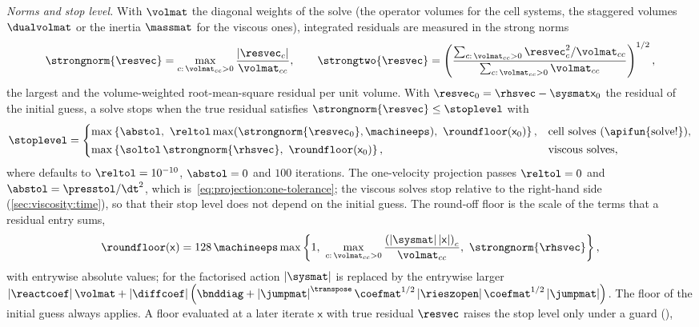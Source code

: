 \emph{Norms and stop level.} With $\volmat$ the diagonal weights of the solve
(the operator volumes for the cell systems, the staggered volumes
$\dualvolmat$ or the inertia $\massmat$ for the viscous ones), integrated
residuals are measured in the strong norms
\begin{equation}\label{eq:solvers:norms}
  \strongnorm{\resvec}=\max_{c:\,\volmat_{cc}>0}\frac{\abs{\resvec_c}}{\volmat_{cc}},\qquad
  \strongtwo{\resvec}=\roundpar{\frac{\sum_{c:\,\volmat_{cc}>0}\resvec_c^2/\volmat_{cc}}{\sum_{c:\,\volmat_{cc}>0}\volmat_{cc}}}^{1/2},
\end{equation}
the largest and the volume-weighted root-mean-square residual per unit volume.
With $\resvec_0=\rhsvec-\sysmat\mathsf{x}_0$ the residual of the initial
guess, a solve stops when the true residual satisfies
$\strongnorm{\resvec}\le\stoplevel$ with
\begin{equation}\label{eq:solvers:target}
  \stoplevel=\begin{cases}
    \max\curlypar{\abstol,\ \reltol\max(\strongnorm{\resvec_0},\machineeps),\ \roundfloor(\mathsf{x}_0)}, & \text{cell solves (\apifun{solve!})},\\[2pt]
    \max\curlypar{\soltol\,\strongnorm{\rhsvec},\ \roundfloor(\mathsf{x}_0)}, & \text{viscous solves},
  \end{cases}
\end{equation}
where  defaults to $\reltol=10^{-10}$, $\abstol=0$ and $100$
iterations. The one-velocity projection passes $\reltol=0$ and
$\abstol=\presstol/\dt^2$, which is~\cref{eq:projection:one-tolerance}; the
viscous solves stop relative to the right-hand side
(\cref{sec:viscosity:time}), so that their stop level does not depend on the
initial guess. The round-off floor is the scale of the terms that a residual
entry sums,
\begin{equation}\label{eq:solvers:floor}
  \roundfloor(\mathsf{x})=128\,\machineeps\max\curlypar{1,\ \max_{c:\,\volmat_{cc}>0}\frac{\roundpar{\abs{\sysmat}\abs{\mathsf{x}}}_c}{\volmat_{cc}},\ \strongnorm{\rhsvec}},
\end{equation}
with entrywise absolute values; for the factorised action $\abs{\sysmat}$ is
replaced by the entrywise larger
$\abs{\reactcoef}\volmat+\abs{\diffcoef}\roundpar{\bnddiag+\abs{\jumpmat}^{\transpose}\coefmat^{1/2}\abs{\rieszopen}\coefmat^{1/2}\abs{\jumpmat}}$.
The floor of the initial guess always applies. A floor evaluated at a later
iterate $\mathsf{x}$ with true residual $\resvec$ raises the stop level only
under a guard (),
